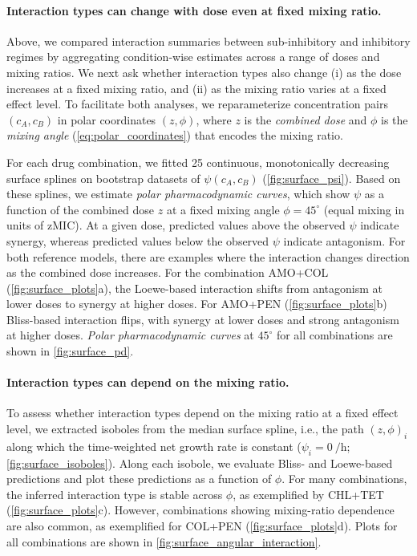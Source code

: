 \paragraph{Interaction types can change with dose even at fixed mixing ratio.}
Above, we compared interaction summaries between sub-inhibitory and inhibitory regimes by aggregating condition-wise estimates across a range of doses and mixing ratios.
We next ask whether interaction types also change (i) as the dose increases at a fixed mixing ratio, and (ii) as the mixing ratio varies at a fixed effect level.
To facilitate both analyses, we reparameterize concentration pairs \((c_A,c_B)\) in polar coordinates \((z,\phi)\), where \(z\) is the \emph{combined dose} and \(\phi\) is the \emph{mixing angle} (\autoref{eq:polar_coordinates}) that encodes the mixing ratio.

For each drug combination, we fitted 25 continuous, monotonically decreasing surface splines on bootstrap datasets of \(\psi(c_A,c_B)\) (\autoref{fig:surface_psi}).
Based on these splines, we estimate \emph{polar pharmacodynamic curves}, which show \(\psi\) as a function of the combined dose \(z\) at a fixed mixing angle \(\phi=45^\circ\) (equal mixing in units of \(\mathrm{zMIC}\)).
At a given dose, predicted values above the observed \(\psi\) indicate synergy, whereas predicted values below the observed \(\psi\) indicate antagonism.
For both reference models, there are examples where the interaction changes direction as the combined dose increases.
For the combination AMO+COL (\autoref{fig:surface_plots}a), the Loewe-based interaction shifts from antagonism at lower doses to synergy at higher doses.
For AMO+PEN (\autoref{fig:surface_plots}b) Bliss-based interaction flips, with synergy at lower doses and strong antagonism at higher doses.
\emph{Polar pharmacodynamic curves} at \(45^\circ\) for all combinations are shown in \autoref{fig:surface_pd}.

\paragraph{Interaction types can depend on the mixing ratio.}
To assess whether interaction types depend on the mixing ratio at a fixed effect level, we extracted isoboles from the median surface spline, i.e., the path \((z,\phi)_i\) along which the time-weighted net growth rate is constant (\(\psi_i=\SI{0}{\per\hour}\); \autoref{fig:surface_isoboles}).
Along each isobole, we evaluate Bliss- and Loewe-based predictions and plot these predictions as a function of \(\phi\).
For many combinations, the inferred interaction type is stable across \(\phi\), as exemplified by CHL+TET (\autoref{fig:surface_plots}c).
However, combinations showing mixing-ratio dependence are also common, as exemplified for COL+PEN (\autoref{fig:surface_plots}d).
Plots for all combinations are shown in \autoref{fig:surface_angular_interaction}.

